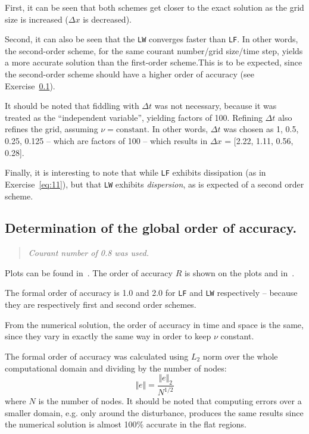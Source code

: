 First, it can be seen that both schemes get closer to the exact solution as the grid size is increased ($\Delta x$ is decreased).

Second, it can also be seen that the \texttt{LW} converges faster than \texttt{LF}. In other words, the second-order scheme, for the same courant number/grid size/time step, yields a more accurate solution than the first-order scheme.This is to be expected, since the second-order scheme should have a higher order of accuracy (see Exercise~\ref{sec:13}).

It should be noted that fiddling with $\Delta t$ was not necessary, because it was treated as the ``independent variable'', yielding factors of 100. Refining $\Delta t$ also refines the grid, assuming $\nu = \text{constant}$. In other words, $\Delta t$ was chosen as 1, 0.5, 0.25, 0.125 -- which are factors of 100 -- which results in $\Delta x$ = [2.22, 1.11, 0.56,  0.28].

Finally, it is interesting to note that while \texttt{LF} exhibits dissipation (as in Exercise~\ref{eq:11}), but that \texttt{LW} exhibits \emph{dispersion}, as is expected of a second order scheme.

\subsection{Determination of the global order of accuracy.}
\label{sec:13}
\begin{quote}
\em Courant number of 0.8 was used.
\end{quote}
Plots can be found in~. The order of accuracy $R$ is shown on the plots and in~.

The formal order of accuracy is 1.0 and 2.0 for \texttt{LF} and \texttt{LW} respectively -- because they are respectively first and second order schemes.

From the numerical solution, the order of accuracy in time and space is the same, since they vary in exactly the same way in order to keep $\nu$ constant.

The formal order of accuracy was calculated using $L_2$ norm over the whole computational domain and dividing by the number of nodes:
\begin{equation*}
    \Vert e \Vert = \dfrac{\Vert e \Vert_2}{N^{1/2}}
\end{equation*}
where $N$ is the number of nodes. It should be noted that computing errors over a smaller domain, e.g. only around the disturbance, produces the same results since the numerical solution is almost 100\% accurate in the flat regions.

